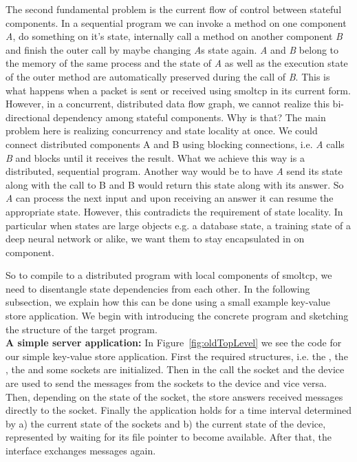 The second fundamental problem is the current flow of control between stateful components. In a sequential program we can invoke a method on one component \emph{A}, do something on it's state, internally call a method on another component \emph{B} and finish the outer call by maybe changing \emph{A}s state again. \emph{A} and \emph{B} belong to the memory of the same process and the state of \emph{A} as well as the execution state of the outer method are automatically preserved during the call of \emph{B}.
This is what happens when a packet is sent or received using smoltcp in its current form. However, in a concurrent, distributed data flow graph, we cannot realize this bi-directional dependency among stateful components. Why is that? The main problem here is realizing concurrency and state locality at once. We could connect distributed components A and B using blocking connections, i.e. \emph{A} calls \emph{B} and blocks until it receives the result. What we achieve this way is a distributed, sequential program. Another way would be to have \emph{A} send its state along with the call to B and B would return this state along with its answer. So \emph{A} can process the next input and upon receiving an answer it can resume the appropriate state. However, this contradicts the requirement of state locality. In particular when states are large objects e.g. a database state, a training state of a deep neural network or alike, we want them to stay encapsulated in on component.\\

So to compile to a distributed program with local components of smoltcp, we need to disentangle state dependencies from each other. In the following subsection, we explain how this can be done using a small example key-value store application. We begin with introducing the concrete program and sketching the structure of the target program.\\

\textbf{A simple server application: } In Figure~\ref{fig:oldTopLevel} we see the code for our simple key-value store application. First the required structures, i.e. the , the , the  and some sockets are initialized. Then in the  call the socket and the device are used to send the messages from the sockets to the device and vice versa. Then, depending on the state of the socket, the store answers received messages directly to the socket. Finally the application holds for a time interval determined by a) the current state of the sockets  and b) the current state of the device, represented by waiting for its file pointer  to become available. After that, the interface exchanges messages again.


